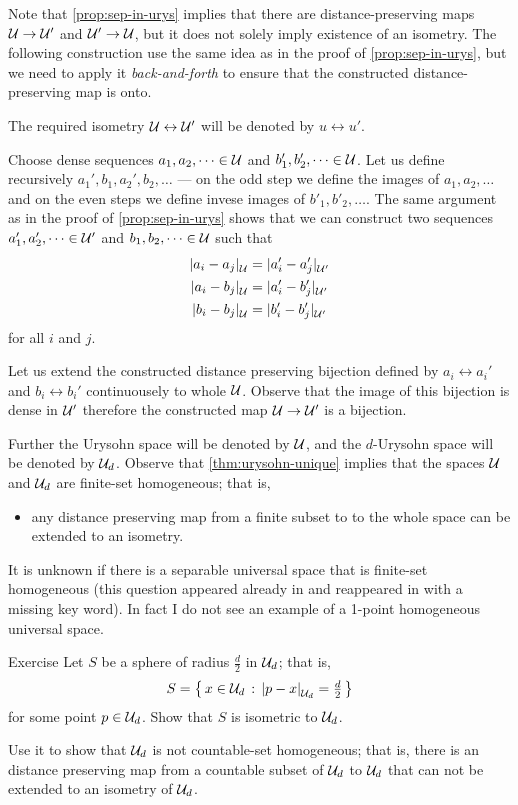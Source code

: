 Note that \ref{prop:sep-in-urys} implies that there are distance-preserving maps $\mathcal{U}\to \mathcal{U}'$ and $\mathcal{U}'\to \mathcal{U}$,
but it does not solely imply existence of an isometry.
The following construction use the same idea as in the proof of \ref{prop:sep-in-urys}, but we need to apply it \emph{back-and-forth} to ensure that the constructed distance-preserving map is onto.

The required isometry $\mathcal{U}\leftrightarrow \mathcal{U}'$ will be denoted by $u \leftrightarrow u'$.

Choose dense sequences $a_1,a_2,\dots\in \mathcal{U}$ and $b'_1,b'_2,\dots\in \mathcal{U}$.
Let us define recursively $a_1',b_1, a_2', b_2,\dots$ --- on the odd step we define the images of $a_1,a_2,\dots$ and on the even steps we define invese images of $b'_1,b'_2,\dots$.
The same argument as in the proof of \ref{prop:sep-in-urys} shows that we can construct two sequences $a_1',a_2',\dots\in \mathcal{U}'$ and $b_1,b_2,\dots\in \mathcal{U}$ such that
\begin{align*}
\dist{a_i}{a_j}{\spc{U}}&=\dist{a_i'}{a_j'}{\spc{U}'}
\\
\dist{a_i}{b_j}{\spc{U}}&=\dist{a_i'}{b_j'}{\spc{U}'}
\\
\dist{b_i}{b_j}{\spc{U}}&=\dist{b_i'}{b_j'}{\spc{U}'}
\end{align*}
for all $i$ and $j$.

Let us extend the constructed distance preserving bijection defined by $a_i\leftrightarrow a_i'$ and $b_i\leftrightarrow b_i'$ continuousely to whole $\mathcal{U}$.
Observe that the image of this bijection is dense in $\mathcal{U}'$ therefore the constructed map $\mathcal{U}\to \mathcal{U}'$ is a bijection.
\qeds

Further the Urysohn space will be denoted by $\mathcal{U}$, and the $d$-Urysohn space will be denoted by $\mathcal{U}_d$.
Observe that \ref{thm:urysohn-unique} implies that the spaces $\mathcal{U}$ and $\mathcal{U}_d$ are finite-set homogeneous; that is,
\begin{itemize}
 \item any distance preserving map from a finite subset to to the whole space can be extended to an isometry.
\end{itemize}
It is unknown if there is a separable universal space that is finite-set homogeneous (this question appeared already in \cite{urysohn} and reappeared in \cite[p. 83]{gromov-2007} with a missing key word).
In fact I do not see an example of a 1-point homogeneous universal space.


\begin{thm}{Exercise}\label{ex:sphere-in-urysohn}
Let $S$ be a sphere of radius $\tfrac d2$ in $\mathcal{U}_d$;
that is, 
\[S=\set{x\in \spc{U}_d}{\dist{p}{x}{\spc{U}_d}=\tfrac d2}\]
for some point $p\in \mathcal{U}_d$.
Show that $S$ is isometric to $\mathcal{U}_d$.

Use it to show that $\mathcal{U}_d$ is not countable-set homogeneous;
that is, there is an distance preserving map from a countable subset of $\mathcal{U}_d$ to $\mathcal{U}_d$ that can not be extended to an isometry of $\mathcal{U}_d$.
\end{thm}

